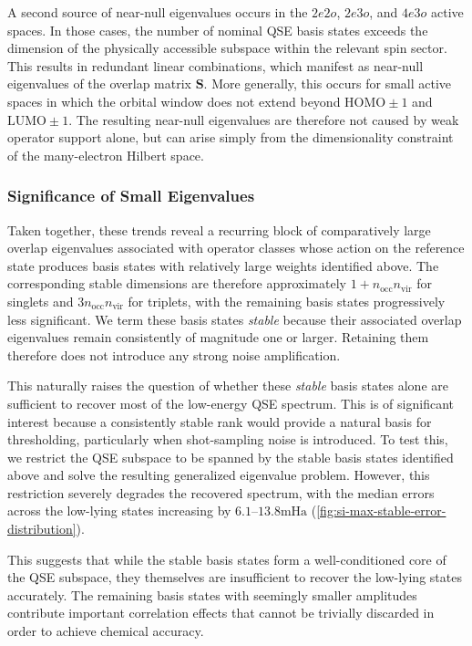 A second source of near-null eigenvalues occurs in the $2e2o$, $2e3o$, and $4e3o$ active spaces. 
In those cases, the number of nominal QSE basis states exceeds the dimension of the physically accessible subspace within the relevant spin sector. 
This results in redundant linear combinations, which manifest as near-null eigenvalues of the overlap matrix $\mathbf{S}$. 
More generally, this occurs for small active spaces in which the orbital window does not extend beyond $\mathrm{HOMO}\pm1$ and $\mathrm{LUMO}\pm1$. 
The resulting near-null eigenvalues are therefore not caused by weak operator support alone, but can arise simply from the dimensionality constraint of the many-electron Hilbert space.

\subsubsection{Significance of Small Eigenvalues}
Taken together, these trends reveal a recurring block of comparatively large overlap eigenvalues associated with operator classes whose action on the reference state produces basis states with relatively large weights identified above.
The corresponding stable dimensions are therefore approximately $1+n_{\mathrm{occ}}n_{\mathrm{vir}}$ for singlets and $3n_{\mathrm{occ}}n_{\mathrm{vir}}$ for triplets, with the remaining basis states progressively less significant. 
We term these basis states \textit{stable} because their associated overlap eigenvalues remain consistently of magnitude one or larger. Retaining them therefore does not introduce any strong noise amplification.

This naturally raises the question of whether these \textit{stable} basis states alone are sufficient to recover most of the low-energy QSE spectrum. 
This is of significant interest because a consistently stable rank would provide a natural basis for thresholding, particularly when shot-sampling noise is introduced.
To test this, we restrict the QSE subspace to be spanned by the stable basis states identified above and solve the resulting generalized eigenvalue problem.
However, this restriction severely degrades the recovered spectrum, with the median errors across the low-lying states increasing by $6.1$--$13.8 \mathrm{mHa}$ (\cref{fig:si-max-stable-error-distribution}). 

This suggests that while the stable basis states form a well-conditioned core of the QSE subspace, they themselves are insufficient to recover the low-lying states accurately.
The remaining basis states with seemingly smaller amplitudes contribute important correlation effects that cannot be trivially discarded in order to achieve chemical accuracy.

